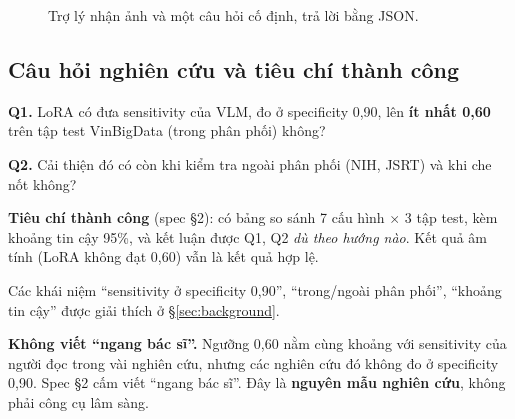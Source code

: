 \begin{figure}[H]
\centering
{}
\caption{Trợ lý nhận ảnh và một câu hỏi cố định, trả lời bằng JSON.}
\label{fig:assistant}
\end{figure}

\subsection{Câu hỏi nghiên cứu và tiêu chí thành công}

\begin{keybox}
\textbf{Q1.} LoRA có đưa sensitivity của VLM, đo ở specificity 0,90, lên \textbf{ít nhất 0,60} trên tập test VinBigData (trong phân phối) không?

\textbf{Q2.} Cải thiện đó có còn khi kiểm tra ngoài phân phối (NIH, JSRT) và khi che nốt không?

\textbf{Tiêu chí thành công} (spec §2): có bảng so sánh 7 cấu hình $\times$ 3 tập test, kèm khoảng tin cậy 95\%,
và kết luận được Q1, Q2 \emph{dù theo hướng nào}. Kết quả âm tính (LoRA không đạt 0,60) vẫn là kết quả hợp lệ.
\end{keybox}

Các khái niệm ``sensitivity ở specificity 0,90'', ``trong/ngoài phân phối'', ``khoảng tin cậy'' được giải thích ở §\ref{sec:background}.

\begin{warnbox}
\textbf{Không viết ``ngang bác sĩ''.} Ngưỡng 0,60 nằm cùng khoảng với sensitivity của người đọc trong vài nghiên cứu,
nhưng các nghiên cứu đó không đo ở specificity 0,90. Spec §2 cấm viết ``ngang bác sĩ''. Đây là \textbf{nguyên mẫu nghiên cứu},
không phải công cụ lâm sàng.
\end{warnbox}
